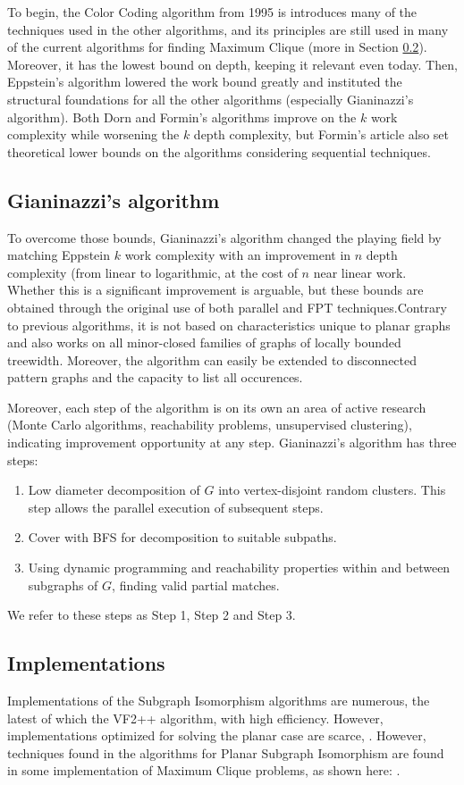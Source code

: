 \documentclass[11pt]{article}       %
\begin{document}
To begin, the Color Coding algorithm \cite{colorCoding} from 1995 is introduces many of the techniques used in the other algorithms, and its principles are still used in many of the current algorithms for finding Maximum Clique (more in Section \ref{review:implementations}). Moreover, it has the lowest bound on depth, keeping it relevant even today. Then, Eppstein's\cite{eppstein} algorithm lowered the work bound greatly and instituted the structural foundations for all the other algorithms (especially Gianinazzi's algorithm). Both Dorn\cite{dorn} and Formin's\cite{fomin} algorithms improve on the $k$ work complexity while worsening the $k$ depth complexity, but Formin's article also set theoretical lower bounds on the algorithms considering sequential techniques. 

\subsection{Gianinazzi's algorithm}
To overcome those bounds, Gianinazzi's algorithm changed the playing field by matching Eppstein $k$ work complexity with an improvement in $n$ depth complexity (from linear to logarithmic, at the cost of $n$ near linear work. Whether this is a significant improvement is arguable, but these bounds are obtained through the original use of both parallel and FPT techniques.Contrary to previous algorithms, it is not based on characteristics unique to planar graphs and also works on all minor-closed families of graphs of locally bounded treewidth. Moreover, the algorithm can easily be extended to disconnected pattern graphs and the capacity to list all occurences. 

Moreover, each step of the algorithm is on its own an area of active research (Monte Carlo algorithms, reachability problems, unsupervised clustering), indicating improvement opportunity at any step. Gianinazzi's algorithm has three steps:
\begin{enumerate}
    \item Low diameter decomposition of $G$ into vertex-disjoint random clusters. This step allows the parallel execution of subsequent steps.
    \item Cover with BFS for decomposition to suitable subpaths.
    \item Using dynamic programming and reachability properties within and between subgraphs of $G$, finding valid partial matches.
\end{enumerate}
We refer to these steps as Step 1, Step 2 and Step 3.
\subsection{Implementations} \label{review:implementations}
Implementations of the Subgraph Isomorphism algorithms are numerous, the latest of which the VF2++ algorithm\cite{implementationVF2}, with high efficiency. However, implementations optimized for solving the planar case are scarce, . However, techniques found in the algorithms for Planar Subgraph Isomorphism are found in some implementation of Maximum Clique problems, as shown here: \cite{cliqueRecent2} \cite{lukas2021} \cite{groversalgo}.
\end{document}
